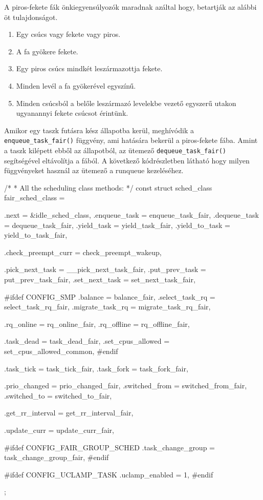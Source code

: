 \noindent A piros-fekete fák önkiegyensúlyozók maradnak azáltal hogy, betartják az alábbi öt tulajdonságot.

\begin{enumerate}
	\item Egy csúcs vagy fekete vagy piros.
	\item A fa gyökere fekete.
	\item Egy piros csúcs mindkét leszármazottja fekete.
	\item Minden levél a fa gyökerével egyszínű. 
	\item Minden csúcsból a belőle leszármazó levelekbe vezető egyszerű utakon ugyanannyi fekete csúcsot érintünk.
\end{enumerate}

Amikor egy taszk futásra kész állapotba kerül, meghívódik a \texttt{enqueue\_task\_fair()}  függvény, ami hatására bekerül a piros-fekete fába. Amint a taszk kilépett ebből az állapotból, az ütemező \texttt{dequeue\_task\_fair()} segítségével eltávolítja a fából.
A következő kódrészletben látható hogy milyen függvényeket használ az ütemező a runqueue kezeléséhez.

\begin{cpp}
/*
 * All the scheduling class methods:
 */
const struct sched_class fair_sched_class = {
	.next			= &idle_sched_class,
	.enqueue_task		= enqueue_task_fair,
	.dequeue_task		= dequeue_task_fair,
	.yield_task		= yield_task_fair,
	.yield_to_task		= yield_to_task_fair,

	.check_preempt_curr	= check_preempt_wakeup,

	.pick_next_task		= __pick_next_task_fair,
	.put_prev_task		= put_prev_task_fair,
	.set_next_task          = set_next_task_fair,

#ifdef CONFIG_SMP
	.balance		= balance_fair,
	.select_task_rq		= select_task_rq_fair,
	.migrate_task_rq	= migrate_task_rq_fair,

	.rq_online		= rq_online_fair,
	.rq_offline		= rq_offline_fair,

	.task_dead		= task_dead_fair,
	.set_cpus_allowed	= set_cpus_allowed_common,
#endif

	.task_tick		= task_tick_fair,
	.task_fork		= task_fork_fair,

	.prio_changed		= prio_changed_fair,
	.switched_from		= switched_from_fair,
	.switched_to		= switched_to_fair,

	.get_rr_interval	= get_rr_interval_fair,

	.update_curr		= update_curr_fair,

#ifdef CONFIG_FAIR_GROUP_SCHED
	.task_change_group	= task_change_group_fair,
#endif

#ifdef CONFIG_UCLAMP_TASK
	.uclamp_enabled		= 1,
#endif
};
\end{cpp}

